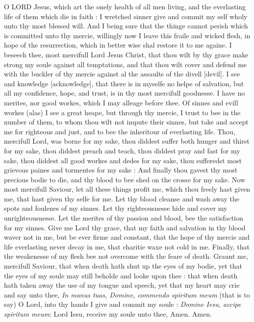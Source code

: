 O
LORD Jesus, which art the onely health of all men living, and the everlasting
life of them which die in faith : I wretched sinner give and commit my
self wholy unto thy most blessed will. And I being sure that the thinge
cannot perish which is committed unto thy mercie, willingly now I leave
this fraile and wicked flesh, in hope of the resurrection, which in better
wise shal restore it to me againe. I beseech thee, most mercifull Lord
Jesus Christ, that thou wilt by thy grace make strong my soule against
all temptations, and that thou wilt cover and defend me with the buckler
of thy mercie against al the assaults of the divell [devil].
I see and knowledge [acknowledge],
that there is in myselfe no helpe of salvation, but all my confidence,
hope, and trust, is in thy most mercifull goodnesse. I have no merites,
nor good workes, which I may alleage before thee. Of sinnes and evill
workes (alas) I see a great heape, but through thy mercie, I trust to
bee in the number of them, to whom thou wilt not impute their sinnes,
but take and accept me for righteous and just, and to bee the inheritour
of everlasting life. Thou, mercifull Lord, was borne for my sake, thou
diddest suffer both hunger and thirst for my sake, thou diddest preach
and teach, thou diddest pray and fast for my sake, thou diddest all good
workes and dedes for my sake, thou sufferedst most grievous paines and
tormentes for my sake : And finally thou gavest thy most precious bodie
to die, and thy blood to bee shed on the crosse for my sake. Now most
mercifull Saviour, let all these things profit me, which thou freely hast
given me, that hast given thy selfe for me. Let thy blood cleanse and
wash away the spots and foulenes of my sinnes. Let thy righteousnesse
hide and cover my unrighteousnesse. Let the merites of thy passion and
blood, bee the satisfaction for my sinnes. Give me Lord thy grace, that
my faith and salvation in thy blood waver not in me, but be ever firme
and constant, that the hope of thy mercie and life everlasting never decay
in me, that charitie waxe not cold in me. Finally, that the weakenesse
of my flesh bee not overcome with the feare of death. Graunt me, mercifull
Saviour, that when death hath shut up the eyes of my bodie, yet that the
eyes of my soule may still beholde and looke upon thee : that when death
hath taken away the use of my tongue and speech, yet that my heart may
crie and say unto thee, \emph{In manus tuas, Domine, commendo spiritum meum}
(that is to say) O Lord, into thy hands I give and commit my soule : \emph{Domine
Iesu, accipe spiritum meum}: Lord Iesu, receive my soule unto thee,
Amen. Amen.

